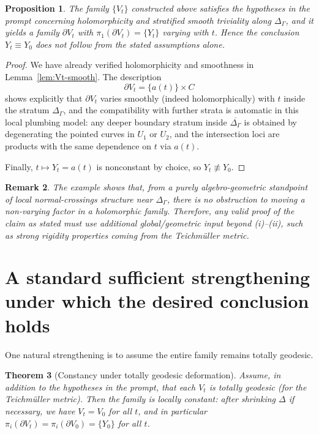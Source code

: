 \documentclass[11pt]{article}
\newtheorem{theorem}{Theorem}
\newtheorem{proposition}[theorem]{Proposition}
\newtheorem{remark}[theorem]{Remark}
\newcommand{\D}{\Delta}
\begin{document}
\begin{proposition}\label{prop:counterexample}
The family $\{V_t\}$ constructed above satisfies the hypotheses in the prompt concerning holomorphicity and stratified smooth triviality along $\Delta_\Gamma$, and it yields a family $\partial V_t$ with $\pi_1(\partial V_t)=\{Y_t\}$ varying with $t$. Hence the conclusion $Y_t\equiv Y_0$ does \emph{not} follow from the stated assumptions alone.
\end{proposition}

\begin{proof}
We have already verified holomorphicity and smoothness in Lemma~\ref{lem:Vt-smooth}. The description
\[
\partial V_t=\{a(t)\}\times C
\]
shows explicitly that $\partial V_t$ varies smoothly (indeed holomorphically) with $t$ inside the stratum $\Delta_\Gamma$, and the compatibility with further strata is automatic in this local plumbing model: any deeper boundary stratum inside $\overline{\Delta_\Gamma}$ is obtained by degenerating the pointed curves in $U_1$ or $U_2$, and the intersection loci are products with the same dependence on $t$ via $a(t)$.

Finally, $t\mapsto Y_t=a(t)$ is nonconstant by choice, so $Y_t\not\equiv Y_0$.
\end{proof}

\begin{remark}
The example shows that, from a purely algebro-geometric standpoint of local normal-crossings structure near $\Delta_\Gamma$, there is no obstruction to moving a non-varying factor in a holomorphic family. Therefore, any valid proof of the claim as stated must use additional global/geometric input beyond (i)--(ii), such as strong rigidity properties coming from the Teichm\"uller metric.
\end{remark}

\section{A standard sufficient strengthening under which the desired conclusion holds}

One natural strengthening is to assume the entire family remains totally geodesic.

\begin{theorem}[Constancy under totally geodesic deformation]\label{thm:tg-family}
Assume, in addition to the hypotheses in the prompt, that \emph{each} $V_t$ is totally geodesic (for the Teichm\"uller metric). Then the family is locally constant: after shrinking $\D$ if necessary, we have $V_t=V_0$ for all $t$, and in particular $\pi_i(\partial V_t)=\pi_i(\partial V_0)=\{Y_0\}$ for all $t$.
\end{theorem}
\end{document}
